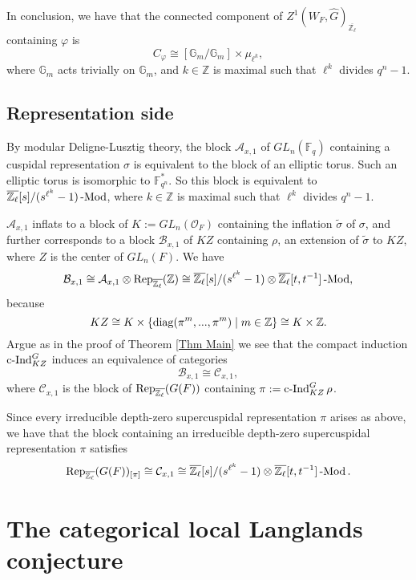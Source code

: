 In conclusion, we have that the connected component of $Z^1(W_F, \hat{G})_{\overline{\mathbb{Z}_{\ell}}}$ containing $\varphi$ is
$$C_{\varphi} \cong [\mathbb{G}_m/\mathbb{G}_m] \times \mu_{\ell^k},$$
where $\mathbb{G}_m$ acts trivially on $\mathbb{G}_m$, and $k \in \mathbb{Z}$ is maximal such that $\ell^k$ divides $q^n-1$.


\section{Representation side}

By modular Deligne-Lusztig theory, the block $\mathcal{A}_{x,1}$ of $GL_n(\mathbb{F}_q)$ containing a cuspidal representation $\sigma$ is equivalent to the block of an elliptic torus. Such an elliptic torus is isomorphic to $\mathbb{F}_{q^n}^*$. So this block is equivalent to $\overline{\mathbb{Z}_{\ell}}[s]/(s^{\ell^k}-1)\operatorname{-Mod}$, where $k \in \mathbb{Z}$ is maximal such that $\ell^k$ divides $q^n-1$.

$\mathcal{A}_{x,1}$ inflats to a block of $K:=GL_n(\mathcal{O}_F)$ containing the inflation $\tilde{\sigma}$ of $\sigma$, and further corresponds to a block $\mathcal{B}_{x,1}$ of $KZ$ containing $\rho$, an extension of $\tilde{\sigma}$ to $KZ$, where $Z$ is the center of $GL_n(F)$. We have
$$\mathcal{B}_{x,1} \cong \mathcal{A}_{x,1} \otimes \operatorname{\operatorname{Rep}}_{\overline{\mathbb{Z}_{\ell}}}(\mathbb{Z}) \cong \overline{\mathbb{Z}_{\ell}}[s]/(s^{\ell^k}-1) \otimes \overline{\mathbb{Z}_{\ell}}[t, t^{-1}]\operatorname{-Mod},$$
because
$$KZ \cong K \times \{\operatorname{\operatorname{diag}}(\pi^m, ..., \pi^m) \;|\; m \in \mathbb{Z}\} \cong K \times \mathbb{Z}.$$
Argue as in the proof of Theorem \ref{Thm Main} we see that the compact induction $\operatorname{\operatorname{c-Ind}}_{KZ}^G$ induces an equivalence of categories
$$\mathcal{B}_{x,1} \cong \mathcal{C}_{x,1},$$
where $\mathcal{C}_{x,1}$ is the block of $\operatorname{\operatorname{Rep}}_{\overline{\mathbb{Z}_{\ell}}}(G(F))$ containing $\pi:=\operatorname{\operatorname{c-Ind}}_{KZ}^G\rho$.

Since every irreducible depth-zero supercuspidal representation $\pi$ arises as above, we have that the block containing an irreducible depth-zero supercuspidal representation $\pi$ satisfies
$$\operatorname{\operatorname{Rep}}_{\overline{\mathbb{Z}_{\ell}}}(G(F))_{[\pi]} \cong \mathcal{C}_{x,1} \cong \overline{\mathbb{Z}_{\ell}}[s]/(s^{\ell^k}-1) \otimes \overline{\mathbb{Z}_{\ell}}[t, t^{-1}]\operatorname{-Mod}.$$



\chapter{The categorical local Langlands conjecture} \label{Chapter CLLC}

